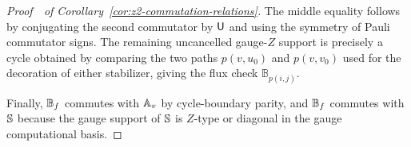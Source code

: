 \documentclass[11pt]{article}
\begin{document}
\begin{proof}[Proof~\theappendixproof\ of Corollary~\ref{cor:z2-commutation-relations}]
The middle equality follows by conjugating the second commutator by $\mathsf{U}$ and using the symmetry of Pauli commutator signs.
The remaining uncancelled gauge-$Z$ support is precisely a cycle obtained by comparing the two paths $p(v, u_0)$ and $p(v, v_0)$ used for the decoration of either stabilizer, giving the flux check $\mathbb{B}_{p(i,j)}$.  

Finally, $\mathbb{B}_f$ commutes with $\mathbb{A}_v$ by cycle-boundary parity, and $\mathbb{B}_f$ commutes with $\mathbb{S}$ because the gauge support of $\mathbb{S}$ is $Z$-type or diagonal in the gauge computational basis.
\end{proof}

\ifdefined\ismainfile
\else
    
    
    
\end{document}
